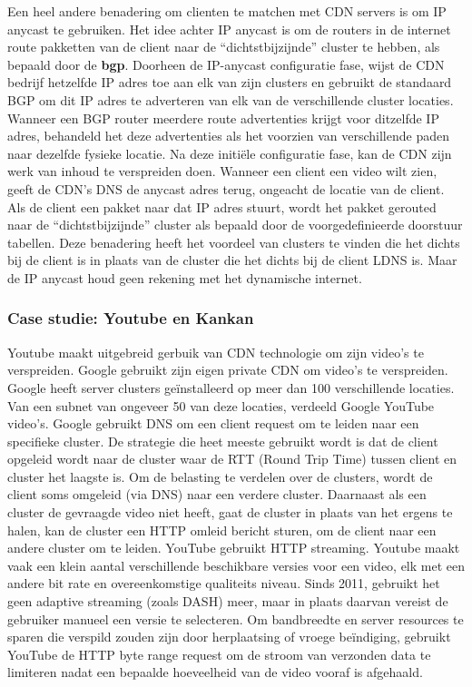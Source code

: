 \newpage

\noindent Een heel andere benadering om clienten te matchen met CDN servers is om IP anycast te gebruiken. Het idee achter IP anycast is om de routers in de internet route pakketten van de client naar de “dichtstbijzijnde” cluster te hebben, als bepaald door de \textbf{\acrfull{bgp}}. Doorheen de IP-anycast configuratie fase, wijst de CDN bedrijf hetzelfde IP adres toe aan elk van zijn clusters en gebruikt de standaard BGP om dit IP adres te adverteren van elk van de verschillende cluster locaties. Wanneer een BGP router meerdere route advertenties krijgt voor ditzelfde IP adres, behandeld het deze advertenties als het voorzien van verschillende paden naar dezelfde fysieke locatie. Na deze initiële configuratie fase, kan de CDN zijn werk van inhoud te verspreiden doen. Wanneer een client een video wilt zien, geeft de CDN’s DNS de anycast adres terug, ongeacht de locatie van de client. Als de client een pakket naar dat IP adres stuurt, wordt het pakket gerouted naar de “dichtstbijzijnde” cluster als bepaald door de voorgedefinieerde doorstuur tabellen.
Deze benadering heeft het voordeel van clusters te vinden die het dichts bij de client is in plaats van de cluster die het dichts bij de client LDNS is. Maar de IP anycast houd geen rekening met het dynamische internet.

\subsubsection{Case studie: Youtube en Kankan}


Youtube maakt uitgebreid gerbuik van CDN technologie om zijn video’s te verspreiden. Google gebruikt zijn eigen private CDN om video’s te verspreiden. Google heeft server clusters geïnstalleerd op meer dan 100 verschillende locaties. Van een subnet van ongeveer 50 van deze locaties, verdeeld Google YouTube video’s. Google gebruikt DNS om een client request om te leiden naar een specifieke cluster. De strategie die heet meeste gebruikt wordt is dat de client opgeleid wordt naar de cluster waar de RTT (Round Trip Time) tussen client en cluster het laagste is. Om de belasting te verdelen over de clusters, wordt de client soms omgeleid (via DNS) naar een verdere cluster. Daarnaast als een cluster de gevraagde video niet heeft, gaat de cluster in plaats van het ergens te halen, kan de cluster een HTTP omleid bericht sturen, om de client naar een andere cluster om te leiden. YouTube gebruikt HTTP streaming. Youtube maakt vaak een klein aantal verschillende beschikbare versies voor een video, elk met een andere bit rate en overeenkomstige qualiteits niveau. Sinds 2011, gebruikt het geen adaptive streaming (zoals DASH) meer, maar in plaats daarvan vereist de gebruiker manueel een versie te selecteren. Om bandbreedte en server resources te sparen die verspild zouden zijn door herplaatsing of vroege beïndiging, gebruikt YouTube de HTTP byte range request om de stroom van verzonden data te limiteren nadat een bepaalde hoeveelheid van de video vooraf is afgehaald.

